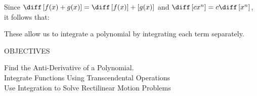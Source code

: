\begin{center}  
\end{center}

Since $\diff \left[f(x) + g(x)\right] = \diff \left[f(x)\right] + \left[g(x)\right]$ and $\diff \left[cx^n\right] = c\diff \left[x^n\right]$, it follows that: 
\begin{center}  
\end{center}

These allow us to integrate a polynomial by integrating each term separately. \par

\begin{tcolorbox}[objective]
    \begin{center}
        OBJECTIVES \\[11pt]
    \end{center}
    Find the Anti-Derivative of a Polynomial. \\
    Integrate Functions Using Transcendental Operations \\
    Use Integration to Solve Rectilinear Motion Problems 
\end{tcolorbox}